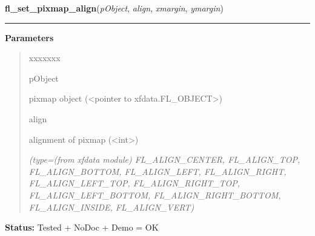 \hspace{.8\funcindent}\begin{boxedminipage}{\funcwidth}

    \raggedright \textbf{fl\_set\_pixmap\_align}(\textit{pObject}, \textit{align}, \textit{xmargin}, \textit{ymargin})

    \vspace{-1.5ex}

    \rule{\textwidth}{0.5\fboxrule}
\setlength{\parskip}{2ex}
\setlength{\parskip}{1ex}
      \textbf{Parameters}
      \vspace{-1ex}

      \begin{quote}
        \begin{Ventry}{xxxxxxx}

          \item[pObject]

          pixmap object ({\textless}pointer to 
          xfdata.FL\_OBJECT{\textgreater})

          \item[align]

          alignment of pixmap ({\textless}int{\textgreater})

            {\it (type=(from xfdata module) FL\_ALIGN\_CENTER, FL\_ALIGN\_TOP, FL\_ALIGN\_BOTTOM, 
FL\_ALIGN\_LEFT, FL\_ALIGN\_RIGHT, FL\_ALIGN\_LEFT\_TOP, 
FL\_ALIGN\_RIGHT\_TOP, FL\_ALIGN\_LEFT\_BOTTOM, FL\_ALIGN\_RIGHT\_BOTTOM, 
FL\_ALIGN\_INSIDE, FL\_ALIGN\_VERT)}

        \end{Ventry}

      \end{quote}

\textbf{Status:} Tested + NoDoc + Demo = OK



    \end{boxedminipage}

    \label{xformslib:library:fl_set_pixmap_align}

    \vspace{0.5ex}

